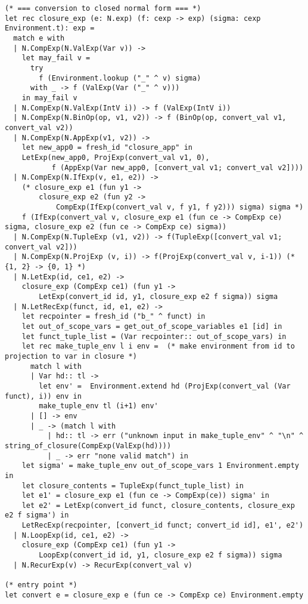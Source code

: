 \begin{lstlisting}[caption=closure.ml]
(* === conversion to closed normal form === *)
let rec closure_exp (e: N.exp) (f: cexp -> exp) (sigma: cexp Environment.t): exp = 
  match e with
  | N.CompExp(N.ValExp(Var v)) -> 
    let may_fail v = 
      try
        f (Environment.lookup ("_" ^ v) sigma)
      with _ -> f (ValExp(Var ("_" ^ v)))
    in may_fail v
  | N.CompExp(N.ValExp(IntV i)) -> f (ValExp(IntV i))
  | N.CompExp(N.BinOp(op, v1, v2)) -> f (BinOp(op, convert_val v1, convert_val v2))
  | N.CompExp(N.AppExp(v1, v2)) -> 
    let new_app0 = fresh_id "closure_app" in
    LetExp(new_app0, ProjExp(convert_val v1, 0), 
           f (AppExp(Var new_app0, [convert_val v1; convert_val v2])))
  | N.CompExp(N.IfExp(v, e1, e2)) -> 
    (* closure_exp e1 (fun y1 -> 
        closure_exp e2 (fun y2 -> 
            CompExp(IfExp(convert_val v, f y1, f y2))) sigma) sigma *)
    f (IfExp(convert_val v, closure_exp e1 (fun ce -> CompExp ce) sigma, closure_exp e2 (fun ce -> CompExp ce) sigma))
  | N.CompExp(N.TupleExp (v1, v2)) -> f(TupleExp([convert_val v1; convert_val v2]))
  | N.CompExp(N.ProjExp (v, i)) -> f(ProjExp(convert_val v, i-1)) (* {1, 2} -> {0, 1} *)
  | N.LetExp(id, ce1, e2) -> 
    closure_exp (CompExp ce1) (fun y1 -> 
        LetExp(convert_id id, y1, closure_exp e2 f sigma)) sigma
  | N.LetRecExp(funct, id, e1, e2) -> 
    let recpointer = fresh_id ("b_" ^ funct) in
    let out_of_scope_vars = get_out_of_scope_variables e1 [id] in
    let funct_tuple_list = (Var recpointer:: out_of_scope_vars) in
    let rec make_tuple_env l i env =  (* make environment from id to projection to var in closure *)
      match l with 
      | Var hd:: tl ->
        let env' =  Environment.extend hd (ProjExp(convert_val (Var funct), i)) env in
        make_tuple_env tl (i+1) env'
      | [] -> env
      | _ -> (match l with 
          | hd:: tl -> err ("unknown input in make_tuple_env" ^ "\n" ^ string_of_closure(CompExp(ValExp(hd))))
          | _ -> err "none valid match") in
    let sigma' = make_tuple_env out_of_scope_vars 1 Environment.empty in
    let closure_contents = TupleExp(funct_tuple_list) in
    let e1' = closure_exp e1 (fun ce -> CompExp(ce)) sigma' in
    let e2' = LetExp(convert_id funct, closure_contents, closure_exp e2 f sigma') in
    LetRecExp(recpointer, [convert_id funct; convert_id id], e1', e2')
  | N.LoopExp(id, ce1, e2) -> 
    closure_exp (CompExp ce1) (fun y1 -> 
        LoopExp(convert_id id, y1, closure_exp e2 f sigma)) sigma
  | N.RecurExp(v) -> RecurExp(convert_val v)

(* entry point *)
let convert e = closure_exp e (fun ce -> CompExp ce) Environment.empty
\end{lstlisting}

